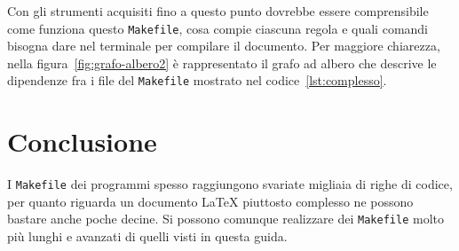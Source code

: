 Con gli strumenti acquisiti fino a questo punto dovrebbe essere comprensibile
come funziona questo \texttt{Makefile}, cosa compie ciascuna regola e quali
comandi bisogna dare nel terminale per compilare il documento.  Per maggiore
chiarezza, nella figura~\ref{fig:grafo-albero2} è rappresentato il grafo ad
albero che descrive le dipendenze fra i file del \texttt{Makefile} mostrato nel
codice~\ref{lst:complesso}.

\section{Conclusione}
\label{sec:conclusione}

I \texttt{Makefile} dei programmi spesso raggiungono svariate migliaia di righe
di codice, per quanto riguarda un documento \LaTeX{}
piuttosto complesso ne possono bastare anche poche decine.  Si possono comunque
realizzare dei \texttt{Makefile} molto più lunghi e avanzati di quelli visti in
questa guida.

